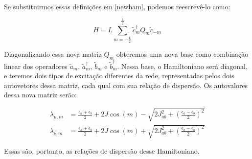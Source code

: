 Se substituirmos essas definições em \eqref{newham}, podemos reescrevê-lo como:

\begin{equation}
H = L \sum_{m=-\frac{L}{2}}^{\frac{L}{2}} \tilde{c}_{m}^{\dagger} Q_{m} \tilde{c}_{-m}
\end{equation}

Diagonalizando essa nova matriz $Q_{m}$ obteremos uma nova base como combinação linear dos operadores $\tilde{a}_m$, $\tilde{a}_m^{\dagger}$, $\tilde{b}_m$ e $\tilde{b}_m^{\dagger}$. Nessa base, o Hamiltoniano será diagonal, e teremos dois tipos de excitação diferentes da rede, representadas pelos dois autovetores dessa matriz, cada qual com sua relação de dispersão. Os autovalores dessa nova matriz serão:

\begin{subequations}
\begin{align}
\lambda_{\mu, m} &=  \frac{\epsilon_{a}+\epsilon_{b}}{2} + 2J\cos(m) - \sqrt{ 2J_{ab}^{2} + \left(\frac{\epsilon_{a} - \epsilon_{b}}{2}\right)^{2}} \\
\lambda_{\nu, m} &=  \frac{\epsilon_{a}+\epsilon_{b}}{2} + 2J\cos(m) + \sqrt{ 2J_{ab}^{2} + \left(\frac{\epsilon_{a} - \epsilon_{b}}{2}\right)^{2}}
\end{align}
\end{subequations}

Essas são, portanto, as relações de dispersão desse Hamiltoniano.